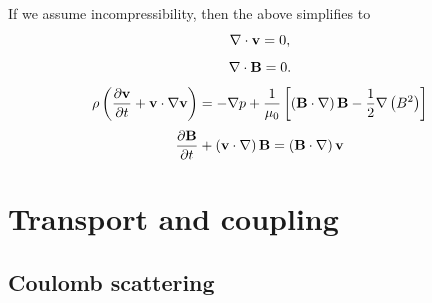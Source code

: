 \documentclass[a4paper,11pt]{report}
\begin{document}
If we assume incompressibility, then the above simplifies to
\begin{equation}
    \nabla \cdot \mathbf{v} = 0,
\end{equation}
\begin{equation}
    \nabla \cdot \mathbf{B} = 0.
    \end{equation}
\begin{equation}
    \rho \left (\frac{\partial \mathbf{v}}{\partial t} + \mathbf{v} \cdot \nabla \mathbf{v} \right ) = - \nabla p  + \frac{1}{\mu_0} \left [ \left ( \mathbf{B} \cdot \nabla \right ) \mathbf{B} - \frac{1}{2} \nabla \left ( B^2 \right ) \right ]
\end{equation}
\begin{equation}
    \frac{\partial \mathbf{B}}{\partial t} + \left ( \mathbf{v} \cdot \nabla \right ) \mathbf{B} = \left ( \mathbf{B} \cdot \nabla \right ) \mathbf{v}
\end{equation}

\chapter{Transport and coupling}

\section{Coulomb scattering}

\end{document}
